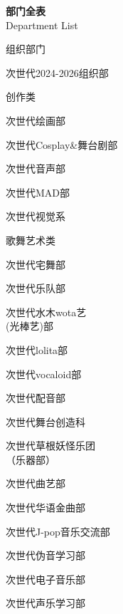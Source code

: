 \vfill
\newpage
\begin{center}
    \fontsize{30pt}{32pt}\selectfont
    \textbf{\textcolor{truepurple}{部门全表}}
    \\[0ex]
    \fontsize{18pt}{20pt}\selectfont
    \textcolor{thuorange}{Department List}
\end{center}
\flushleft
\begin{multicols}{3}
    
    \begin{categorysection}{组织部门}
        \item 次世代2024-2026组织部
    \end{categorysection}
    
    \begin{categorysection}{创作类}
        \item 次世代绘画部
        \item 次世代Cosplay\&舞台剧部
        \item 次世代音声部
        \item 次世代MAD部
        \item 次世代视觉系
    \end{categorysection}
    
    \begin{categorysection}{歌舞艺术类}
        \item 次世代宅舞部
        \item 次世代乐队部
        \item 次世代水木wota艺\\(光棒艺)部
        \item 次世代lolita部
        \item 次世代vocaloid部
        \item 次世代配音部
        \item 次世代舞台创造科
        \item 次世代草根妖怪乐团\\（乐器部）
        \item 次世代曲艺部
        \item 次世代华语金曲部
        \item 次世代J-pop音乐交流部
        \item 次世代伪音学习部
        \item 次世代电子音乐部
        \item 次世代声乐学习部
    \end{categorysection}
    

\end{multicols}

